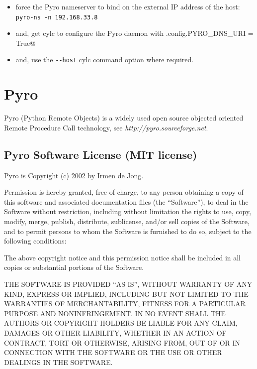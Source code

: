 \documentclass[11pt,a4paper]{article}
\begin{document}
\begin{itemize}

    \item force the Pyro nameserver to bind on the external IP address
        of the host: \lstinline=pyro-ns -n 192.168.33.8=

    \item and, get cylc to configure the Pyro daemon 
        with \lstinline@Pyro.config.PYRO_DNS_URI = True@ 
        
    \item and, use the \lstinline=--host= cylc command option where
        required.

\end{itemize}

        
\section{Pyro} 
\label{Pyro}

Pyro (Python Remote Objects) is a widely used open source objected
oriented Remote Procedure Call technology, see {\em
http://pyro.sourceforge.net}.

\subsection{Pyro Software License (MIT license)}
\label{PyroSoftwareLicense(MITlicense)}

Pyro is Copyright (c) 2002  by Irmen de Jong.

Permission is hereby granted, free of charge, to any person obtaining a
copy of this software and associated documentation files (the
``Software''), to deal in the Software without restriction, including
without limitation the rights to use, copy, modify, merge, publish,
distribute, sublicense, and/or sell copies of the Software, and to
permit persons to whom the Software is furnished to do so, subject to
the following conditions:

The above copyright notice and this permission notice shall be included
in all copies or substantial portions of the Software.

THE SOFTWARE IS PROVIDED ``AS IS'', WITHOUT WARRANTY OF ANY KIND,
EXPRESS OR IMPLIED, INCLUDING BUT NOT LIMITED TO THE WARRANTIES OF
MERCHANTABILITY, FITNESS FOR A PARTICULAR PURPOSE AND NONINFRINGEMENT.
IN NO EVENT SHALL THE AUTHORS OR COPYRIGHT HOLDERS BE LIABLE FOR ANY
CLAIM, DAMAGES OR OTHER LIABILITY, WHETHER IN AN ACTION OF CONTRACT,
TORT OR OTHERWISE, ARISING FROM, OUT OF OR IN CONNECTION WITH THE
SOFTWARE OR THE USE OR OTHER DEALINGS IN THE SOFTWARE.
                                          
\end{document}
